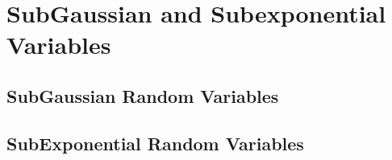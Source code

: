 \section{SubGaussian and Subexponential Variables}

\subsection{SubGaussian Random Variables}

\subsection{SubExponential Random Variables}